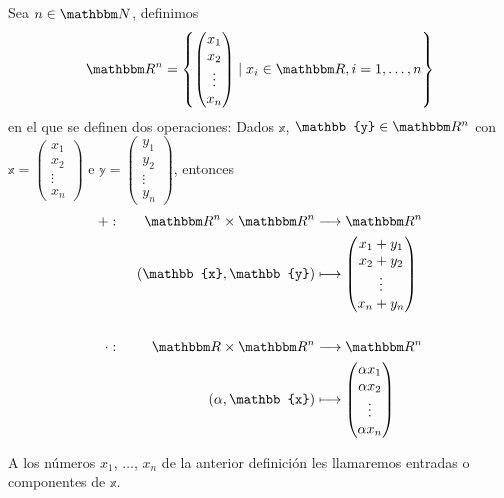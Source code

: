 \begin{definition}
    Sea $n \in \NN$, definimos
    $$\RR[n]=\left\lbrace \begin{pmatrix} x_1 \\ x_2 \\ \vdots \\ x_n \end{pmatrix} \mid x_i \in \RR, i=1, \dots, n \right\rbrace$$
    en el que se definen dos operaciones: Dados $\mathbb{x}$, $\mathbb{y} \in \RR[n]$ con $\displaystyle \mathbb{x} = \begin{pmatrix} x_1 \\ x_2 \\ \vdots \\ x_n \end{pmatrix}$ e $\displaystyle \mathbb{y} = \begin{pmatrix} y_1 \\ y_2 \\ \vdots \\ y_n \end{pmatrix}$, entonces
    \begin{alignat*}{2}
        + & : & \quad \RR[n] \times \RR[n] & \longrightarrow \RR[n] \\
        & & ( \mathbb{x}, \mathbb{y} ) & \longmapsto \begin{pmatrix} x_1 + y_1 \\ x_2 + y_2 \\ \vdots \\ x_n + y_n \end{pmatrix} \\
        & \\
        \cdot & : & \quad \RR \times \RR[n] & \longrightarrow \RR[n] \\
        & & ( \alpha, \mathbb{x}) & \longmapsto \begin{pmatrix} \alpha x_1 \\ \alpha x_2 \\ \vdots \\ \alpha x_n \end{pmatrix}
    \end{alignat*}
\end{definition}

\begin{definition}
    A los números $x_1$, $\dots$, $x_n$ de la anterior definición les llamaremos entradas o componentes de $\mathbb{x}$.
\end{definition}


